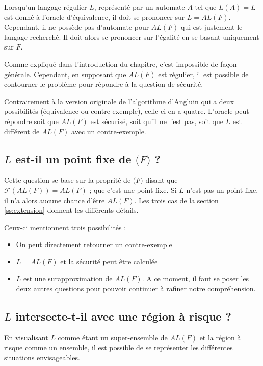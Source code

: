 Lorsqu'un langage régulier $L$, représenté par un automate $A$ tel que $L(A)=L$ est donné à l'oracle d'équivalence, il doit se prononcer sur $L=AL(F)$. Cependant, il ne possède pas d'automate pour $AL(F)$ qui est justement le langage recherché. Il doit alors se prononcer sur l'égalité en se basant uniquement sur $F$.

Comme expliqué dans l'introduction du chapitre, c'est impossible de façon générale. Cependant, en supposant que $AL(F)$ est régulier, il est possible de contourner le problème pour répondre à la question de sécurité.

Contrairement à la version originale de l'algorithme d'Angluin qui a deux possibilités (équivalence ou contre-exemple), celle-ci en a quatre. L'oracle peut répondre soit que $AL(F)$ est sécurisé, soit qu'il ne l'est pas, soit que $L$ est différent de $AL(F)$ avec un contre-exemple.


\subsection*{$L$ est-il un point fixe de $\mathcal(F)$ ?}

Cette question se base sur la proprité de $\mathcal(F)$ disant que $\mathcal{F}(AL(F))=AL(F)$ ; que c'est une point fixe. Si $L$ n'est pas un point fixe, il n'a alors aucune chance d'être $AL(F)$. Les trois cas de la section \ref{ss:extension} donnent les différents détails.

Ceux-ci mentionnent trois possibilités :
\begin{itemize}
  \item On peut directement retourner un contre-exemple
  \item $L=AL(F)$ et la sécurité peut être calculée
  \item $L$ est une surapproximation de $AL(F)$. A ce moment, il faut se poser les deux autres questions pour pouvoir continuer à rafiner notre compréhension.
\end{itemize}

\subsection*{$L$ intersecte-t-il avec une région à risque ?}

En visualisant $L$ comme étant un super-ensemble de $AL(F)$ et la région à risque comme un ensemble, il est possible de se représenter les différentes situations envisageables.





